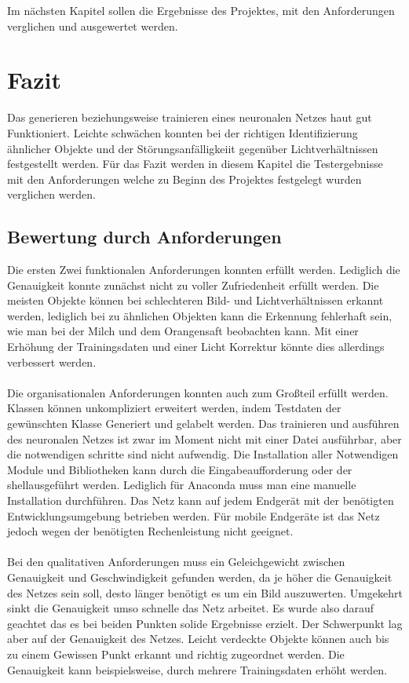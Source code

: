 \documentclass[a4paper,12pt,oneside]{article}
\begin{document}
Im nächsten Kapitel sollen die Ergebnisse des Projektes, mit den Anforderungen verglichen und ausgewertet werden.

\newpage

\section{Fazit}
Das generieren beziehungsweise trainieren eines neuronalen Netzes haut gut Funktioniert. Leichte schwächen konnten bei der richtigen Identifizierung ähnlicher Objekte und der Störungsanfälligkeiit gegenüber Lichtverhältnissen festgestellt werden. Für das Fazit werden in diesem Kapitel die Testergebnisse mit den Anforderungen welche zu Beginn des Projektes festgelegt wurden verglichen werden.\\

\subsection{Bewertung durch Anforderungen}

Die ersten Zwei funktionalen Anforderungen konnten erfüllt werden. Lediglich die Genauigkeit konnte zunächst nicht zu voller Zufriedenheit erfüllt werden. Die meisten Objekte können bei schlechteren Bild- und Lichtverhältnissen erkannt werden, lediglich bei zu ähnlichen Objekten kann die Erkennung fehlerhaft sein, wie man bei der Milch und dem Orangensaft beobachten kann. Mit einer Erhöhung der Trainingsdaten und einer Licht Korrektur könnte dies allerdings verbessert werden.\\
\\
Die organisationalen Anforderungen konnten auch zum Großteil erfüllt werden. Klassen können unkompliziert erweitert werden, indem Testdaten der gewünschten Klasse Generiert und gelabelt werden. Das trainieren und ausführen des neuronalen Netzes ist zwar im Moment nicht mit einer Datei ausführbar, aber die notwendigen schritte sind nicht aufwendig. Die Installation aller Notwendigen Module und Bibliotheken kann durch die Eingabeaufforderung oder der \glqq shell\grqq ausgeführt werden. Lediglich für Anaconda muss man eine manuelle Installation durchführen. Das Netz kann auf jedem Endgerät mit der benötigten Entwicklungsumgebung betrieben werden. Für mobile Endgeräte ist das Netz jedoch wegen der benötigten Rechenleistung nicht geeignet.\\
\\
Bei den qualitativen Anforderungen muss ein Geleichgewicht zwischen Genauigkeit und Geschwindigkeit gefunden werden, da je höher die Genauigkeit des Netzes sein soll, desto länger benötigt es um ein Bild auszuwerten. Umgekehrt sinkt die Genauigkeit umso schnelle das Netz arbeitet. Es wurde also darauf geachtet das es bei beiden Punkten solide Ergebnisse erzielt. Der Schwerpunkt lag aber auf der Genauigkeit des Netzes. Leicht verdeckte Objekte können auch bis zu einem Gewissen Punkt erkannt und richtig zugeordnet werden. Die Genauigkeit kann beispielsweise, durch mehrere Trainingsdaten erhöht werden.\\
\end{document}
